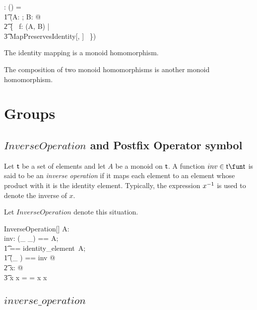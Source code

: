 \documentclass[11pt, oneside]{article}
\begin{document}
\begin{gendef}[\genT, \genU]
\homMonoid: \monoid \genT \cross \monoid \genU \fun \power (\genT \fun \genU)
\where
\homMonoid = \\
\t1	(\lambda A: \monoid \genT; B: \monoid \genU @ \\
\t2		\{~ f: \homSemigroup(A, B) | \\
\t3			MapPreservesIdentity[\genT, \genU] ~\})
\end{gendef}

\begin{remark}
The identity mapping is a monoid homomorphism.
\end{remark}

\begin{remark}
The composition of two monoid homomorphisms is another monoid homomorphism.
\end{remark}

\section{Groups}

\subsection{$InverseOperation$ and Postfix Operator symbol }

Let $\mathsf{t}$ be a set of elements and let $A$ be a monoid on $\mathsf{t}$.
A function $inv \in \genT \fun \genT$ is said to be an {\em inverse operation} if it maps each element
to an element whose product with it is the identity element.
Typically, the expression $x ^{-1}$ is used to denote the inverse of $x$.

Let $InverseOperation$ denote this situation.

\begin{schema}{InverseOperation}[\genT]
A: \monoid \genT \\
inv: \genT \fun \genT
\where
\LET (\_ \mulG \_) == A; \\
\t1	\oneG == identity\_element~A; \\
\t1	(\_ \invG) == inv @ \\
\t2		\forall x: \genT @ \\
\t3			x \mulG x \invG = \oneG = x \invG  \mulG x
\end{schema}

\subsection{$inverse\_operation$}
\end{document}
